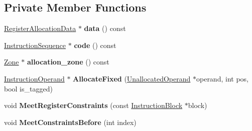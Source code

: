 \subsection*{Private Member Functions}
\begin{DoxyCompactItemize}
\item 
\hyperlink{classv8_1_1internal_1_1compiler_1_1_register_allocation_data}{Register\+Allocation\+Data} $\ast$ {\bfseries data} () const \hypertarget{classv8_1_1internal_1_1compiler_1_1_constraint_builder_a9613907b2152637fc6a35fc04a285eb6}{}\label{classv8_1_1internal_1_1compiler_1_1_constraint_builder_a9613907b2152637fc6a35fc04a285eb6}

\item 
\hyperlink{classv8_1_1internal_1_1compiler_1_1_instruction_sequence}{Instruction\+Sequence} $\ast$ {\bfseries code} () const \hypertarget{classv8_1_1internal_1_1compiler_1_1_constraint_builder_a0fdaf5630b4edec9dc5d77b250bd377a}{}\label{classv8_1_1internal_1_1compiler_1_1_constraint_builder_a0fdaf5630b4edec9dc5d77b250bd377a}

\item 
\hyperlink{classv8_1_1internal_1_1_zone}{Zone} $\ast$ {\bfseries allocation\+\_\+zone} () const \hypertarget{classv8_1_1internal_1_1compiler_1_1_constraint_builder_a20ae1afca36ae5369061bb49df91f088}{}\label{classv8_1_1internal_1_1compiler_1_1_constraint_builder_a20ae1afca36ae5369061bb49df91f088}

\item 
\hyperlink{classv8_1_1internal_1_1compiler_1_1_instruction_operand}{Instruction\+Operand} $\ast$ {\bfseries Allocate\+Fixed} (\hyperlink{classv8_1_1internal_1_1compiler_1_1_unallocated_operand}{Unallocated\+Operand} $\ast$operand, int pos, bool is\+\_\+tagged)\hypertarget{classv8_1_1internal_1_1compiler_1_1_constraint_builder_a7d64e651dce772691614295be7c9baa7}{}\label{classv8_1_1internal_1_1compiler_1_1_constraint_builder_a7d64e651dce772691614295be7c9baa7}

\item 
void {\bfseries Meet\+Register\+Constraints} (const \hyperlink{classv8_1_1internal_1_1compiler_1_1_instruction_block}{Instruction\+Block} $\ast$block)\hypertarget{classv8_1_1internal_1_1compiler_1_1_constraint_builder_a3767165376b661fc2b73d9c8c9af6748}{}\label{classv8_1_1internal_1_1compiler_1_1_constraint_builder_a3767165376b661fc2b73d9c8c9af6748}

\item 
void {\bfseries Meet\+Constraints\+Before} (int index)\hypertarget{classv8_1_1internal_1_1compiler_1_1_constraint_builder_a8155be148a077dc8579c98cced6571fe}{}\label{classv8_1_1internal_1_1compiler_1_1_constraint_builder_a8155be148a077dc8579c98cced6571fe}


\end{DoxyCompactItemize}
